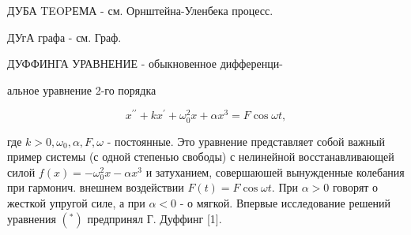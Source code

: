 \documentclass[10pt]{article}
\begin{document}
ДУБА TEOPЕМА - см. Орнштейна-Уленбека процесс.



ДУгА графа - см. Граф.



ДУФФИНГА УРАВНЕНИЕ - обыкновенное дифференци-



альное уравнение 2-го порядка



\[

x^{\prime \prime}+k x^{\prime}+\omega_{0}^{2} x+\alpha x^{3}=F \cos \omega t,

\]



где $k>0, \omega_{0}, \alpha, F, \omega$ - постоянные. Это уравнение представляет собой важный пример системы (с одной степенью свободы) с нелинейной восстанавливающей силой $f(x)=-\omega_{0}^{2} x-\alpha x^{3}$ и затуханием, совершаюшей вынужденные колебания при гармонич. внешнем воздействии $F(t)=F \cos \omega t$. При $\alpha>0$ говорят о жесткой упругой силе, а при $\alpha<0$ - о мягкой. Впервые исследование решений уравнения $\left(^{*}\right)$ предпринял Г. Дуффинг [1].
\end{document}

